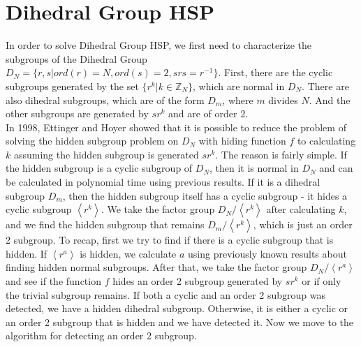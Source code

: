 \documentclass[12pt]{article}
\theoremstyle{plain}
\theoremstyle{definition}
\begin{document}
\section{Dihedral Group HSP}
In order to solve Dihedral Group HSP, we first need to characterize the subgroups of the Dihedral Group $D_N=\lbrace r,s| ord(r)=N,ord(s)=2,srs=r^{-1}\rbrace$. First, there are the cyclic subgroups generated by the set $\lbrace r^k|k\in\mathbb{Z}_N\rbrace$, which are normal in $D_N$. There are also dihedral subgroups, which are of the form $D_m$, where $m$ divides $N$. And the other subgroups are generated by $sr^k$ and are of order 2. \\
In 1998, Ettinger and Hoyer	showed that it is possible to reduce the problem of solving the hidden subgroup problem on $D_N$ with hiding function $f$ to calculating $k$ assuming the hidden subgroup is generated $sr^k$. The reason is fairly simple. If the hidden subgroup is a cyclic subgroup of $D_N$, then it is normal in $D_N$ and can be calculated in polynomial time using previous results. If it is a dihedral subgroup $D_m$, then the hidden subgroup itself has a cyclic subgroup - it hides a cyclic subgroup $\left<r^k\right>$. We take the factor group $D_N/\left<r^k\right>$ after calculating $k$, and we find the hidden subgroup that remains $D_m/\left<r^k\right>$, which is just an order 2 subgroup. To recap, first we try to find if there is a cyclic subgroup that is hidden. If $\left<r^a\right>$ is hidden, we calculate $a$ using previously known results about finding hidden normal subgroups. After that, we take the factor group $D_N/\left<r^a\right>$ and see if the function $f$ hides an order 2 subgroup generated by $sr^k$ or if only the trivial subgroup remains. If both a cyclic and an order 2 subgroup was detected, we have a hidden dihedral subgroup. Otherwise, it is either a cyclic or an order 2 subgroup that is hidden and we have detected it. Now we move to the algorithm for detecting an order 2 subgroup.\\
\end{document}

